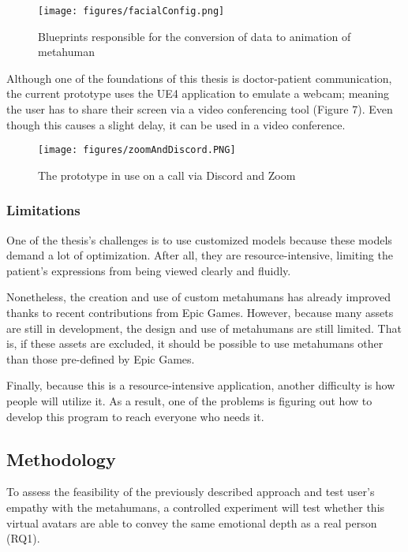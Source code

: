 \begin{figure}[h!]
\texttt{[image: figures/facialConfig.png]}
\centering
\caption{Blueprints responsible for the conversion of data to animation of metahuman}
\end{figure}

Although one of the foundations of this thesis is doctor-patient communication, the current prototype uses the UE4 application to emulate a webcam; meaning the user has to share their screen via a video conferencing tool (Figure 7). Even though this causes a slight delay, it can be used in a video conference.

\begin{figure}[h!]
\texttt{[image: figures/zoomAndDiscord.PNG]}
\centering
\caption{The prototype in use on a call via Discord and Zoom}
\end{figure}

\subsubsection{Limitations}
One of the thesis's challenges is to use customized models because these models demand a lot of optimization. After all, they are resource-intensive, limiting the patient's expressions from being viewed clearly and fluidly. 

Nonetheless, the creation and use of custom metahumans has already improved thanks to recent contributions from Epic Games. However, because many assets are still in development, the design and use of metahumans are still limited. That is, if these assets are excluded, it should be possible to use metahumans other than those pre-defined by Epic Games.

Finally, because this is a resource-intensive application, another difficulty is how people will utilize it. As a result, one of the problems is figuring out how to develop this program to reach everyone who needs it.

\subsection{Methodology}
To assess the feasibility of the previously described approach and test user's empathy with the metahumans, a controlled experiment will test whether this virtual avatars are able to convey the same emotional depth as a real person (RQ1).

